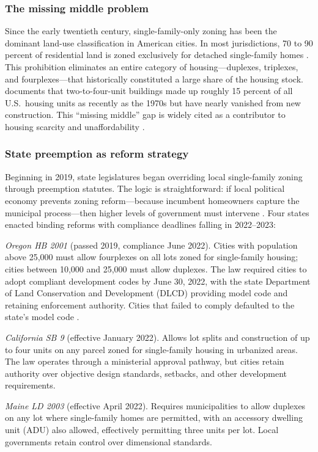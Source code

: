 \documentclass[12pt]{article}
\begin{document}
\subsubsection*{The missing middle problem} Since the early twentieth century, single-family-only zoning has been the dominant land-use classification in American cities. In most jurisdictions, 70 to 90 percent of residential land is zoned exclusively for detached single-family homes \citep{mangin2014}. This prohibition eliminates an entire category of housing---duplexes, triplexes, and fourplexes---that historically constituted a large share of the housing stock. \citet{gray2023} documents that two-to-four-unit buildings made up roughly 15 percent of all U.S.\ housing units as recently as the 1970s but have nearly vanished from new construction. This ``missing middle'' gap is widely cited as a contributor to housing scarcity and unaffordability \citep{glaesergyourko2018}.

\subsubsection*{State preemption as reform strategy} Beginning in 2019, state legislatures began overriding local single-family zoning through preemption statutes. The logic is straightforward: if local political economy prevents zoning reform---because incumbent homeowners capture the municipal process---then higher levels of government must intervene \citep{quigley2005}. Four states enacted binding reforms with compliance deadlines falling in 2022--2023:

\textit{Oregon HB 2001} (passed 2019, compliance June 2022). Cities with population above 25,000 must allow fourplexes on all lots zoned for single-family housing; cities between 10,000 and 25,000 must allow duplexes. The law required cities to adopt compliant development codes by June 30, 2022, with the state Department of Land Conservation and Development (DLCD) providing model code and retaining enforcement authority. Cities that failed to comply defaulted to the state's model code \citep{oregon2020}.

\textit{California SB 9} (effective January 2022). Allows lot splits and construction of up to four units on any parcel zoned for single-family housing in urbanized areas. The law operates through a ministerial approval pathway, but cities retain authority over objective design standards, setbacks, and other development requirements.

\textit{Maine LD 2003} (effective April 2022). Requires municipalities to allow duplexes on any lot where single-family homes are permitted, with an accessory dwelling unit (ADU) also allowed, effectively permitting three units per lot. Local governments retain control over dimensional standards.
\end{document}
